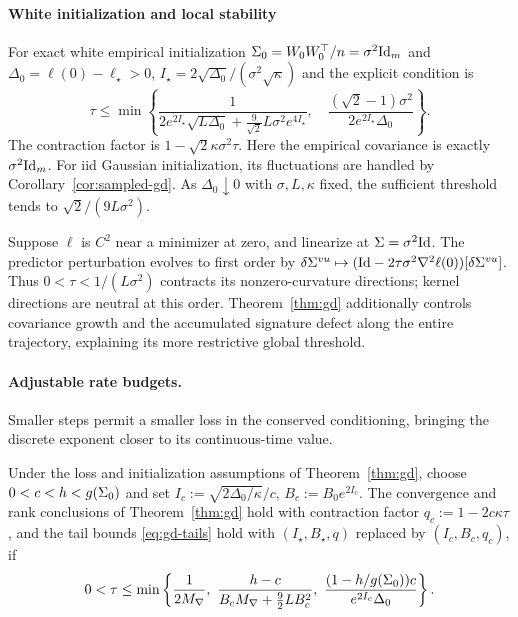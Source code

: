 \paragraph{White initialization and local stability}
For exact white empirical initialization
$\Sigma_0=W_0W_0^\top/n=\sigma^2\mathrm{Id}_m$ and $\Delta_0=\ell(0)-\ell_\star>0$,
$I_\star=2\sqrt{\Delta_0}/(\sigma^2\sqrt\kappa)$ and the explicit
condition is
\[
 \tau\le\min\left\{
 \frac1{2e^{2I_\star}\sqrt{L\Delta_0}
                 +\frac9{\sqrt2}L\sigma^2e^{4I_\star}},\quad
 \frac{(\sqrt2-1)\sigma^2}{2e^{2I_\star}\Delta_0}
 \right\}.
\]
The contraction factor is $1-\sqrt2\kappa\sigma^2\tau$.
Here the empirical covariance is exactly $\sigma^2\mathrm{Id}_m$. For iid Gaussian
initialization, its fluctuations are handled by Corollary~\ref{cor:sampled-gd}.
As $\Delta_0\downarrow0$ with $\sigma,L,\kappa$ fixed, the sufficient
threshold tends to $\sqrt2/(9L\sigma^2)$.


\begin{remark}\label{rem:gd-local}
Suppose $\ell$ is $C^2$ near a minimizer at zero, and linearize at
$\Sigma=\sigma^2\mathrm{Id}$. The predictor perturbation evolves to first order by
$\delta\Sigma^{vu}\mapsto(\mathrm{Id}-2\tau\sigma^2\nabla^2\ell(0))[\delta\Sigma^{vu}]$.
Thus $0<\tau<1/(L\sigma^2)$ contracts its nonzero-curvature directions;
kernel directions are neutral at this order. Theorem~\ref{thm:gd} additionally controls
covariance growth and the accumulated signature defect along the entire
trajectory, explaining its more restrictive global threshold.
\end{remark}

\paragraph{Adjustable rate budgets.}
Smaller steps permit a smaller loss in the conserved conditioning,
bringing the discrete exponent closer to its continuous-time value.
\begin{proposition}\label{prop:gd-adjustable}
Under the loss and initialization assumptions of Theorem~\ref{thm:gd},
choose $0<c<h<g(\Sigma_0)$ and set
$I_c:=\sqrt{2\Delta_0/\kappa}/c$, $B_c:=B_0e^{2I_c}$.
The convergence and rank conclusions of Theorem~\ref{thm:gd} hold with
contraction factor $q_c:=1-2c\kappa\tau$, and the tail bounds
\eqref{eq:gd-tails} hold with $(I_\star,B_\star,q)$ replaced by
$(I_c,B_c,q_c)$, if
\[
 0<\tau\le\min\left\{\frac1{2M_{\nabla}},\
 \frac{h-c}{B_cM_{\nabla}+\frac92LB_c^2},\
 \frac{(1-h/g(\Sigma_0))c}{e^{2I_c}\Delta_0}\right\}.
\]
\end{proposition}

